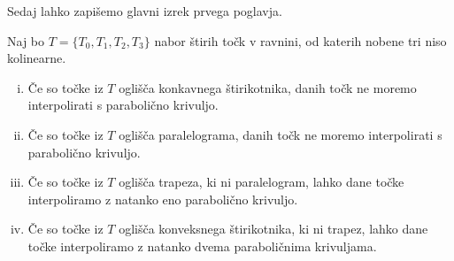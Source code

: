 \documentclass[mat1]{fmfdelo}
\begin{document}
\begin{dokaz}


\end{dokaz}

Sedaj lahko zapišemo glavni izrek prvega poglavja.

\begin{izrek}
Naj bo $T = \{ T_0, T_1, T_2, T_3 \}$ nabor štirih točk v ravnini, od katerih nobene tri niso kolinearne.

\begin{enumerate}[i)]

\item Če so točke iz $T$ oglišča konkavnega štirikotnika, danih točk ne moremo interpolirati s parabolično krivuljo.

\item Če so točke iz $T$ oglišča paralelograma, danih točk ne moremo interpolirati s parabolično krivuljo.

\item Če so točke iz $T$ oglišča trapeza, ki ni paralelogram, lahko dane točke interpoliramo z natanko eno parabolično krivuljo.

\item Če so točke iz $T$ oglišča konveksnega štirikotnika, ki ni trapez, lahko dane točke interpoliramo z natanko dvema paraboličnima krivuljama.
\end{enumerate}

\end{izrek}
\end{document}

